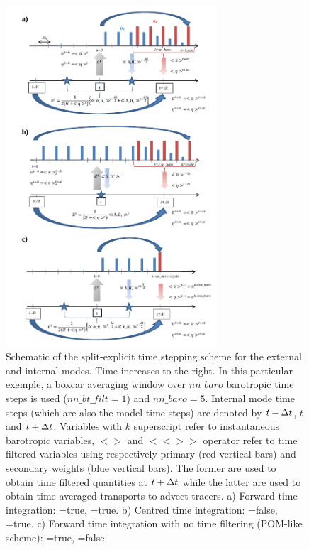 \begin{figure}[!t]    \begin{center}
\includegraphics[width=0.7\textwidth]{./TexFiles/Figures/Fig_DYN_dynspg_ts.pdf}
\caption{  \label{Fig_DYN_dynspg_ts}
Schematic of the split-explicit time stepping scheme for the external 
and internal modes. Time increases to the right. In this particular exemple, 
a boxcar averaging window over $nn\_baro$ barotropic time steps is used ($nn\_bt\_filt=1$) and $nn\_baro=5$.
Internal mode time steps (which are also the model time steps) are denoted 
by $t-\Delta t$, $t$ and $t+\Delta t$. Variables with $k$ superscript refer to instantaneous barotropic variables, 
$< >$ and $<< >>$ operator refer to time filtered variables using respectively primary (red vertical bars) and secondary weights (blue vertical bars). 
The former are used to obtain time filtered quantities at $t+\Delta t$ while the latter are used to obtain time averaged 
transports to advect tracers.
a) Forward time integration: =true, =true. 
b) Centred time integration: =false, =true. 
c) Forward time integration with no time filtering (POM-like scheme): =true, =false. }
\end{center}    \end{figure}

